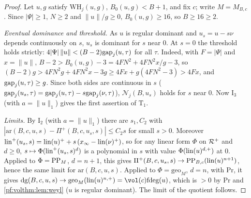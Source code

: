 \begin{proof}
Let $u,g$ satisfy $\mathrm{WH}_j(u,g)$, $B_0(u,g)<B+1$, and fix $c$; write $M=M_{B,c}$. Since
$|\Psi|\ge1$, $N\ge2$ and $\|u\|/g\ge0$, $B_0(u,g)\ge16$, so $B\ge16\ge2$.

\emph{Eventual dominance and threshold.} As $u$ is regular dominant and $u_s=u-s\nu$ depends continuously on
$s$, $u_s$ is dominant for $s$ near $0$. At $s=0$ the threshold holds strictly:
$4|\Psi|\,\|u\|<(B-2)\mathrm{gap}_j(u,\tau)$ for all $\tau$. Indeed, with $F=|\Psi|$ and $x=\|u\|$,
$B-2>B_0(u,g)-3=4FN^2+4FN^2x/g-3$, so $(B-2)g>4FN^2g+4FN^2x-3g\ge4Fx+g(4FN^2-3)>4Fx$, and
$\mathrm{gap}_j(u,\tau)\ge g$. Since both sides are continuous in $s$ ($\mathrm{gap}_j(u_s,\tau)=\mathrm{gap}_j(u,\tau)-
s\mathrm{gap}_j(\nu,\tau)$), $\mathcal N_j(B,u_s)$ holds for $s$ near $0$. Now $\mathrm{I}_3$ (with $a=\|u\|_1$)
gives the first assertion of $\mathrm{T}_1$.

\emph{Limits.} By $\mathrm{I}_2$ (with $a=\|u\|_1$) there are $s_1,C_2$ with
$|\mathrm{ar}(B,c,u,s)-\Pi^+(B,c,u_s,s)|\le C_2s$ for small $s>0$. Moreover
$\mathrm{lin}^+(u_s,s)=\mathrm{lin}(u)^++s\,(x_\infty-\mathrm{lin}(\nu)^+)$, so for any linear form $\Phi$ on
$\mathcal{R}^+$ and $d\ge0$, $s\mapsto\Phi(\mathrm{lin}^+(u_s,s)^d)$ is a polynomial in $s$ with value
$\Phi(\mathrm{lin}(u)^{d,+})$ at $0$. Applied to $\Phi=\mathrm{PP}_M$, $d=n+1$, this gives
$\Pi^+(B,c,u_s,s)\to\mathrm{PP}_{B,c}(\mathrm{lin}(u)^{n+1})$, hence the same limit for
$\mathrm{ar}(B,c,u,s)$. Applied to $\Phi=\mathrm{geo}_M$, $d=n$, with $\mathrm{Pr}$, it gives
$\mathrm{dg}(B,c,u,s)\to\mathrm{geo}_M(\volthmlin(u)^{n,+})=\vol(c)\volthmfd(u)$, which is $>0$ by
$\mathrm{Pr}$ and \cref{pf:volthm:lem:weyl} ($u$ is regular dominant). The limit of the quotient follows.
\end{proof}

